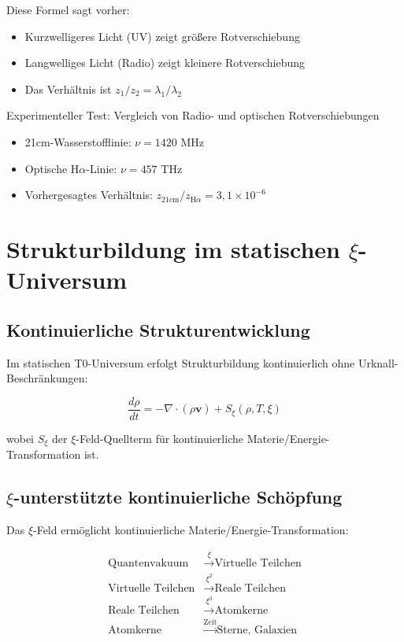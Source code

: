 	Diese Formel sagt vorher:
	\begin{itemize}
		\item Kurzwelligeres Licht (UV) zeigt größere Rotverschiebung
		\item Langwelliges Licht (Radio) zeigt kleinere Rotverschiebung
		\item Das Verhältnis ist $z_1/z_2 = \lambda_1/\lambda_2$
	\end{itemize}
	
	\begin{experiment}
		Experimenteller Test: Vergleich von Radio- und optischen Rotverschiebungen
		\begin{itemize}
			\item 21cm-Wasserstofflinie: $\nu = 1420$ MHz
			\item Optische H$\alpha$-Linie: $\nu = 457$ THz
			\item Vorhergesagtes Verhältnis: $z_{21\text{cm}}/z_{\text{H}\alpha} = 3{,}1 \times 10^{-6}$
		\end{itemize}
	\end{experiment}
	
	\section{Strukturbildung im statischen $\xi$-Universum}
	
	\subsection{Kontinuierliche Strukturentwicklung}
	
	Im statischen T0-Universum erfolgt Strukturbildung kontinuierlich ohne Urknall-Beschränkungen:
	
	\begin{equation}
		\frac{d\rho}{dt} = -\nabla \cdot (\rho \mathbf{v}) + S_\xi(\rho, T, \xi)
	\end{equation}
	
	wobei $S_\xi$ der $\xi$-Feld-Quellterm für kontinuierliche Materie/Energie-Transformation ist.
	
	\subsection{$\xi$-unterstützte kontinuierliche Schöpfung}
	
	Das $\xi$-Feld ermöglicht kontinuierliche Materie/Energie-Transformation:
	
	\begin{align}
		\text{Quantenvakuum} &\xrightarrow{\xi} \text{Virtuelle Teilchen} \\
		\text{Virtuelle Teilchen} &\xrightarrow{\xi^2} \text{Reale Teilchen} \\
		\text{Reale Teilchen} &\xrightarrow{\xi^3} \text{Atomkerne} \\
		\text{Atomkerne} &\xrightarrow{\text{Zeit}} \text{Sterne, Galaxien}
	\end{align}
	
